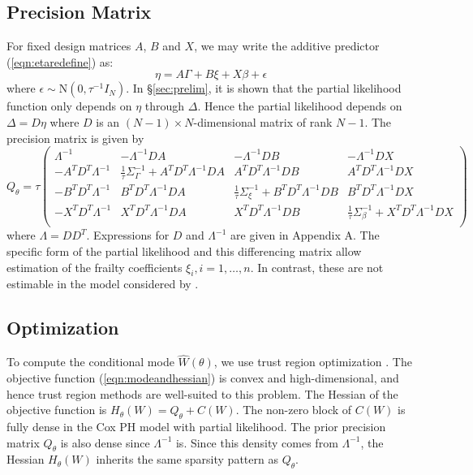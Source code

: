 \documentclass[]{article}
\begin{document}
\subsection{Precision Matrix}\label{subsec:Q} 

For fixed design matrices $A$, $B$ and $X$, we may write the additive predictor (\ref{eqn:etaredefine}) as:
\begin{equation}
\eta = A\Gamma + B\xi + X\beta + \epsilon
\end{equation}
where $\epsilon \sim \text{N}\left( 0,\tau^{-1}I_{N}\right)$.
In \S\ref{sec:prelim}, it is shown that the partial likelihood function only depends on $\eta$ through $\Delta$. Hence the partial likelihood depends on $\Delta = D\eta$ where $D$ is an $(N -1) \times N $-dimensional matrix of rank $N -1$. The precision matrix is given by
\begin{equation}\label{eqn:precmat}
Q_{\theta} = \tau\begin{pmatrix}
\Lambda^{-1} & -\Lambda^{-1}DA & -\Lambda^{-1}DB & - \Lambda^{-1}DX \\
- A^{T}D^{T}\Lambda^{-1} & \frac{1}{\tau}\Sigma_{\Gamma}^{-1} +  A^{T}D^{T}\Lambda^{-1}DA &  A^{T}D^{T}\Lambda^{-1}DB &  A^{T}D^{T}\Lambda^{-1}DX \\
- B^{T}D^{T}\Lambda^{-1} &  B^{T}D^{T}\Lambda^{-1}DA & \frac{1}{\tau}\Sigma_{\xi}^{-1} +  B^{T}D^{T}\Lambda^{-1}DB & B^{T}D^{T}\Lambda^{-1}DX \\
- X^{T}D^{T}\Lambda^{-1} &  X^{T}D^{T}\Lambda^{-1}DA & X^{T}D^{T}\Lambda^{-1}DB & \frac{1}{\tau}\Sigma_{\beta}^{-1} +  X^{T}D^{T}\Lambda^{-1}DX \\
\end{pmatrix}
\end{equation}
where $\Lambda = DD^{T}$. Expressions for $D$ and $\Lambda^{-1}$ are given in Appendix A. The specific form of the partial likelihood and this differencing matrix allow estimation of the frailty coefficients $\xi_{i},i = 1,\ldots,n$. In contrast, these are not estimable in the model considered by \citet{casecross}.

\subsection{Optimization}\label{subsec:opt}

To compute the conditional mode $\hat{W}(\theta)$, we use trust region optimization \citep{trustoptim}. The objective function (\ref{eqn:modeandhessian}) is convex and high-dimensional, and hence trust region methods are well-suited to this problem. The Hessian of the objective function is $H_{\theta}(W) = Q_{\theta} + C(W)$. The non-zero block of $C(W)$ is fully dense in the Cox PH model with partial likelihood. The prior precision matrix $Q_{\theta}$ is also dense since $\Lambda^{-1}$ is. Since this density comes from $\Lambda^{-1}$, the Hessian $H_{\theta}(W)$ inherits the same sparsity pattern as $Q_{\theta}$.
\end{document}
